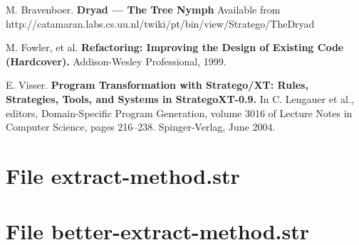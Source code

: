 \documentclass[a4paper,10pt]{article}
\begin{document}
\begin{thebibliography}{99}

 M. Bravenboer. \textbf{Dryad --- The Tree Nymph}
Available from
http://catamaran.labs.cs.uu.nl/twiki/pt/bin/view/Stratego/TheDryad

 M. Fowler, et al. \textbf{Refactoring: Improving the Design of Existing Code
(Hardcover).} Addison-Wesley Professional, 1999.

 E. Visser. \textbf{Program Transformation with Stratego/XT:
Rules, Strategies, Tools, and Systems in StrategoXT-0.9.} In C.
Lengauer et al., editors, Domain-Specific Program Generation, volume
3016 of Lecture Notes in Computer Science, pages 216--238.
Spinger-Verlag, June 2004.

\end{thebibliography}

\begin{appendix}

\section{File \textsf{extract-method.str}}


\section{File \textsf{better-extract-method.str}}


\end{appendix}
\end{document}
